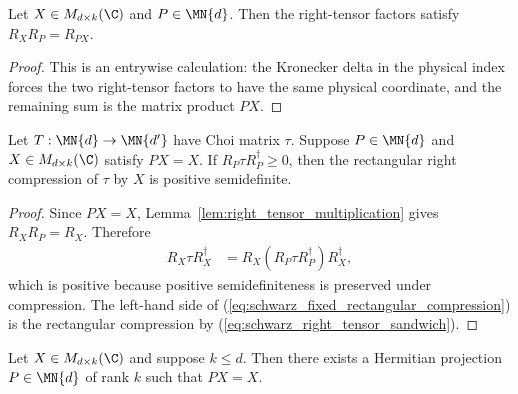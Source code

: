 \begin{lemma}
    \label{lem:right_tensor_multiplication}
    \leanok
    Let $X\in M_{d\times k}(\C)$ and $P\in\MN{d}$. Then the right-tensor
    factors satisfy $R_XR_P=R_{PX}$.
\end{lemma}

\begin{proof}
    \leanok
    This is an entrywise calculation: the Kronecker delta in the physical
    index forces the two right-tensor factors to have the same physical
    coordinate, and the remaining sum is the matrix product $PX$.
\end{proof}

\begin{lemma}
    \label{lem:square_sandwich_fixed_rectangular_compression}
    \leanok
    Let $T:\MN{d}\to\MN{d'}$ have Choi matrix $\tau$. Suppose
    $P\in\MN{d}$ and $X\in M_{d\times k}(\C)$ satisfy $PX=X$. If
    $R_P\tau R_P^\dagger\ge0$, then the rectangular right compression of
    $\tau$ by $X$ is positive semidefinite.
\end{lemma}

\begin{proof}
    \leanok
    Since $PX=X$, Lemma~\ref{lem:right_tensor_multiplication} gives
    $R_XR_P=R_X$. Therefore
    \begin{align}
        R_X\tau R_X^\dagger
         & =R_X(R_P\tau R_P^\dagger)R_X^\dagger,
        \label{eq:schwarz_fixed_rectangular_compression}
    \end{align}
    which is positive because positive semidefiniteness is preserved under
    compression. The left-hand side of
    (\ref{eq:schwarz_fixed_rectangular_compression}) is the rectangular
    compression by (\ref{eq:schwarz_right_tensor_sandwich}).
\end{proof}

\begin{lemma}
    \label{lem:rank_k_projection_fixing_rectangular_factor}
    \leanok
    Let $X\in M_{d\times k}(\C)$ and suppose $k\le d$. Then there exists a
    Hermitian projection $P\in\MN{d}$ of rank $k$ such that $PX=X$.
\end{lemma}

